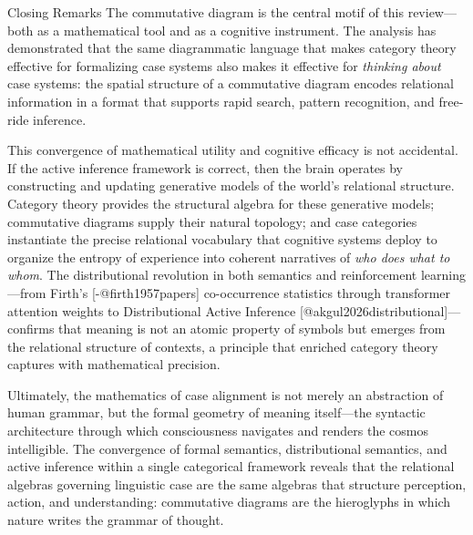 \documentclass[
  ignorenonframetext,
]{beamer}
\begin{document}
\begin{frame}{Closing Remarks}
\protect{}\label{closing-remarks}
The commutative diagram is the central motif of this review---both as a
mathematical tool and as a cognitive instrument. The analysis has
demonstrated that the same diagrammatic language that makes category
theory effective for formalizing case systems also makes it effective
for \emph{thinking about} case systems: the spatial structure of a
commutative diagram encodes relational information in a format that
supports rapid search, pattern recognition, and free-ride inference.

This convergence of mathematical utility and cognitive efficacy is not
accidental. If the active inference framework is correct, then the brain
operates by constructing and updating generative models of the world's
relational structure. Category theory provides the structural algebra
for these generative models; commutative diagrams supply their natural
topology; and case categories instantiate the precise relational
vocabulary that cognitive systems deploy to organize the entropy of
experience into coherent narratives of \emph{who does what to whom}. The
distributional revolution in both semantics and reinforcement
learning---from Firth's {[}-@firth1957papers{]} co-occurrence statistics
through transformer attention weights to Distributional Active Inference
{[}@akgul2026distributional{]}---confirms that meaning is not an atomic
property of symbols but emerges from the relational structure of
contexts, a principle that enriched category theory captures with
mathematical precision.

Ultimately, the mathematics of case alignment is not merely an
abstraction of human grammar, but the formal geometry of meaning
itself---the syntactic architecture through which consciousness
navigates and renders the cosmos intelligible. The convergence of formal
semantics, distributional semantics, and active inference within a
single categorical framework reveals that the relational algebras
governing linguistic case are the same algebras that structure
perception, action, and understanding: commutative diagrams are the
hieroglyphs in which nature writes the grammar of thought.
\end{frame}
\end{document}

